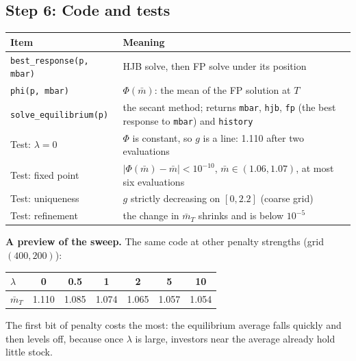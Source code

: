 \documentclass[11pt]{article}
\newcommand{\mb}{\bar m}
\begin{document}
\subsection*{Step 6: Code and tests}
\begin{center}
\small
\begin{tabular}{@{}l>{\raggedright\arraybackslash}p{}@{}}
\toprule
Item & Meaning \\
\midrule
\texttt{best\_response(p, mbar)} & HJB solve, then FP solve under its position \\
\texttt{phi(p, mbar)} & $\Phi(\mb)$: the mean of the FP solution at $T$ \\
\texttt{solve\_equilibrium(p)} & the secant method; returns \texttt{mbar}, \texttt{hjb},
  \texttt{fp} (the best response to \texttt{mbar}) and \texttt{history} \\
\midrule
Test: $\lambda=0$ & $\Phi$ is constant, so $g$ is a line: 1.110 after two evaluations \\
Test: fixed point & $|\Phi(\mb)-\mb|<10^{-10}$, $\mb\in(1.06,1.07)$, at most six evaluations \\
Test: uniqueness & $g$ strictly decreasing on $[0,2.2]$ (coarse grid) \\
Test: refinement & the change in $\mb_T$ shrinks and is below $10^{-5}$ \\
\bottomrule
\end{tabular}
\end{center}

\textbf{A preview of the sweep.} The same code at other penalty strengths (grid $(400,200)$):
\begin{center}
\small
\begin{tabular}{@{}lcccccc@{}}
\toprule
$\lambda$ & 0 & 0.5 & 1 & 2 & 5 & 10 \\
\midrule
$\mb_T$ & 1.110 & 1.085 & 1.074 & 1.065 & 1.057 & 1.054 \\
\bottomrule
\end{tabular}
\end{center}
The first bit of penalty costs the most: the equilibrium average falls quickly and then levels
off, because once $\lambda$ is large, investors near the average already hold little stock.
\end{document}
